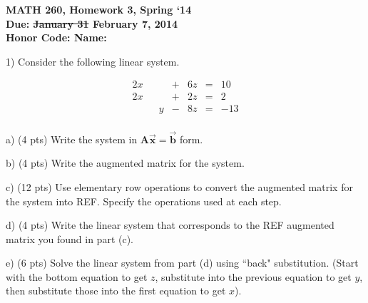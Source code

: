 \documentclass{article}
\begin{document}
\begin{flushleft}
	\bfseries{MATH 260, Homework 3, Spring `14}\\
	\bfseries{Due: \st{January 31} February 7, 2014}\\
	\bfseries{Honor Code:} \hspace{3.5in}\bfseries{Name:}\\
\end{flushleft}
\begin{flushleft}
\vspace{.25in}

1) Consider the following linear system.

\begin{equation*}
\begin{array}{ccccccr}
2x &   &    & + & 6z & = & 10\\
2x &   &    & + & 2z & = & 2\\
   &   &  y & - & 8z & = &-13\\

\end{array}
\end{equation*}

a) (4 pts) Write the system in $\textbf{A}\vec{\textbf{x}} = \vec{\textbf{b}}$ form.

\vspace{1in}

b) (4 pts) Write the augmented matrix for the system.

\vspace{1in}

c) (12 pts) Use elementary row operations to convert the augmented matrix for the system into REF.  Specify the operations used at each step.

\newpage

d) (4 pts) Write the linear system that corresponds to the REF augmented matrix you found in part (c).

\vspace{1.5in}

e) (6 pts) Solve the linear system from part (d) using ``back" substitution.  (Start with the bottom equation to get $z$, substitute into the previous equation to get $y$, then substitute those into the first equation to get $x$).

\end{flushleft}
\end{document}
